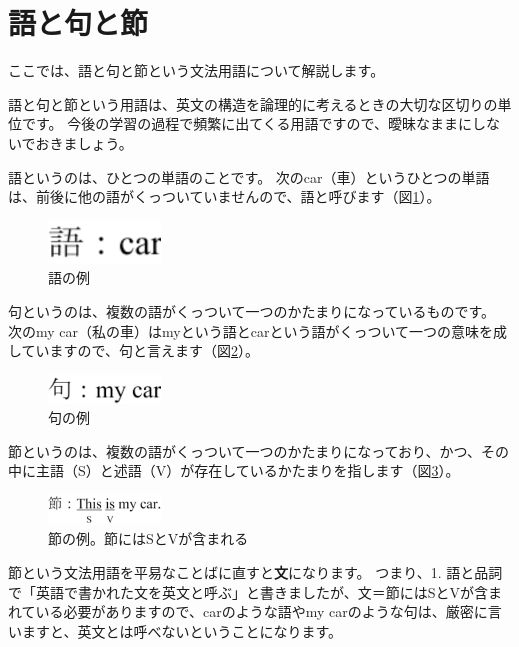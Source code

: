 \documentclass[titlepage]{jsarticle}
\begin{document}
 \section{語と句と節}
 ここでは、語と句と節という文法用語について解説します。
 
 語と句と節という用語は、英文の構造を論理的に考えるときの大切な区切りの単位です。
 今後の学習の過程で頻繁に出てくる用語ですので、曖昧なままにしないでおきましょう。

 語というのは、ひとつの単語のことです。
 次のcar（車）というひとつの単語は、前後に他の語がくっついていませんので、語と呼びます（図\ref{fig4}）。
  \begin{figure}[htbp]
   \begin{center}
    \includegraphics[width=3cm]{./figure/fig4.pdf}
    \caption{語の例}
    \label{fig4}
   \end{center}
  \end{figure}

  句というのは、複数の語がくっついて一つのかたまりになっているものです。
  次のmy car（私の車）はmyという語とcarという語がくっついて一つの意味を成していますので、句と言えます（図\ref{fig5}）。
  \begin{figure}[htbp]
   \begin{center}
    \includegraphics[width=3cm]{./figure/fig5.pdf}
    \caption{句の例}
    \label{fig5}
   \end{center}
  \end{figure}


  節というのは、複数の語がくっついて一つのかたまりになっており、かつ、その中に主語（S）と述語（V）が存在しているかたまりを指します（図\ref{fig6}）。
  \begin{figure}[htbp]
   \begin{center}
    \includegraphics[width=3cm]{./figure/fig6.pdf}
    \caption{節の例。節にはSとVが含まれる}
    \label{fig6}
   \end{center}
  \end{figure}


  節という文法用語を平易なことばに直すと{\bf 文}になります。
  つまり、1. 語と品詞で「英語で書かれた文を英文と呼ぶ」と書きましたが、文＝節にはSとVが含まれている必要がありますので、carのような語やmy carのような句は、厳密に言いますと、英文とは呼べないということになります。
\end{document}
